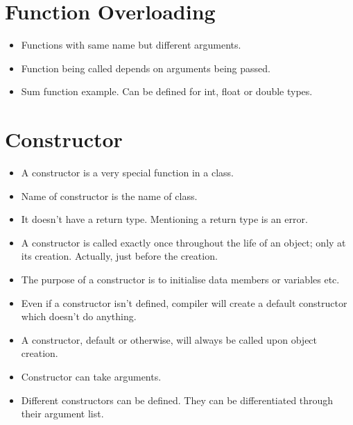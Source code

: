 \documentclass[12pt,a4paper]{article}
\begin{document}
\section{Function Overloading}
\begin{itemize}
\item Functions with same name but different arguments.
\item Function being called depends on arguments being passed.
\item Sum function example. Can be defined for int, float or double types.
\end{itemize}
\section{Constructor}
\begin{itemize}
\item A constructor is a very special function in a class.
\item Name of constructor is the name of class.
\item It doesn't have a return type. Mentioning a return type is an error.
\item A constructor is called exactly once throughout the life of an object; only at its creation. Actually, just before the creation.
\item The purpose of a constructor is to initialise data members or variables etc.
\item Even if a constructor isn't defined, compiler will create a default constructor which doesn't do anything.
\item A constructor, default or otherwise, will always be called upon object creation.
\item Constructor can take arguments.
\item Different constructors can be defined. They can be differentiated through their argument list.
\end{itemize}
\end{document}
